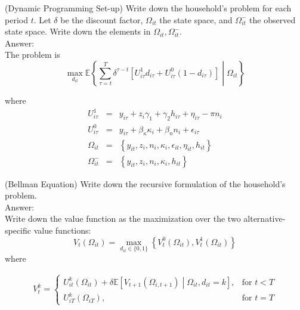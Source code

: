 \begin{exercise} (Dynamic Programming Set-up)
Write down the household's problem for each period $t$. Let $\delta$ be the discount factor, $\Omega_{it}$ the state space, and $\Omega_{it}^-$ the observed state space. Write down the elements in $\Omega_{it},\Omega_{it}^-$.\\
\noindent Answer:\\	
\noindent The problem is
\begin{equation}
\max_{d_{it}} \mathbb{E}\left\{ \sum\limits_{\tau=t}^{T}\delta^{\tau-t} \left[U^{1}_{i\tau}d_{i\tau} + U^{0}_{i\tau}\left( 1-d_{i\tau} \right)\right] \middle| \Omega_{it}\right\} 
\end{equation}

\noindent where
\begin{eqnarray}
U^{1}_{i\tau} &=& y_{i\tau} + z_{i}\gamma_{1} + \gamma_{2}h_{i\tau} + \eta_{i\tau} - \pi n_{i}\\
U^{0}_{i\tau} &=& y_{i\tau} + \beta_{\kappa}\kappa_{i} + \beta_{n}n_{i} + \epsilon_{i\tau}\\
\Omega_{it} &=& \left\{ y_{it}, z_{i}, n_{i}, \kappa_{i}, \epsilon_{it}, \eta_{it}, h_{it}\right\}\\
\Omega_{it}^- &=& \left\{ y_{it}, z_{i}, n_{i}, \kappa_{i}, h_{it}\right\}
\end{eqnarray}
\end{exercise}
\begin{exercise} (Bellman Equation)
Write down the recursive formulation of the household's problem.\\
\noindent Answer:\\
\noindent Write down the value function as the maximization over the two alternative-specific value functions:
\begin{equation}
V_t\left(\Omega_{it}\right) = \max_{d_{it} \in \{0, 1\}} \left\{V^{0}_{t} \left(\Omega_{it} \right),V^{1}_{t} \left(\Omega_{it} \right)\right\}
\end{equation}
\noindent where

\begin{eqnarray}
V^{k}_t =
\begin{cases}
U^{k}_{it}\left(\Omega_{it}\right) + \delta \mathbb{E} \left[V_{t+1}\left(\Omega_{i,t+1} \right) \middle| \Omega_{it}, d_{it} = k \right], & \text{for } t < T \\
U^{k}_{iT}\left(\Omega_{iT}\right),& \text{for } t = T
\end{cases}
\end{eqnarray}
\end{exercise}


